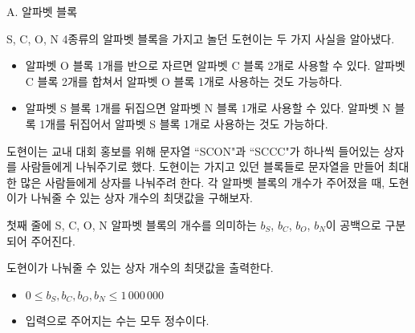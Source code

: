 \def\probtitle{알파벳 블록}
\def\probno{A} %

\begin{problem}{\probno{}. \probtitle{}}

S, C, O, N 4종류의 알파벳 블록을 가지고 놀던 도현이는 두 가지 사실을 알아냈다.

\begin{itemize}[topsep=0pt,noitemsep]
    \item 알파벳 O 블록 1개를 반으로 자르면 알파벳 C 블록 2개로 사용할 수 있다. 알파벳 C 블록 2개를 합쳐서 알파벳 O 블록 1개로 사용하는 것도 가능하다.
    \item 알파벳 S 블록 1개를 뒤집으면 알파벳 N 블록 1개로 사용할 수 있다. 알파벳 N 블록 1개를 뒤집어서 알파벳 S 블록 1개로 사용하는 것도 가능하다.
\end{itemize}

도현이는 교내 대회 홍보를 위해 문자열 ``SCON"과 ``SCCC"가 하나씩 들어있는 상자를 사람들에게 나눠주기로 했다. 도현이는 가지고 있던 블록들로 문자열을 만들어 최대한 많은 사람들에게 상자를 나눠주려 한다. 각 알파벳 블록의 개수가 주어졌을 때, 도현이가 나눠줄 수 있는 상자 개수의 최댓값을 구해보자.

\InputFile

첫째 줄에 S, C, O, N 알파벳 블록의 개수를 의미하는 $b_S$, $b_C$, $b_O$, $b_N$이 공백으로 구분되어 주어진다.

\OutputFile

도현이가 나눠줄 수 있는 상자 개수의 최댓값을 출력한다.

\Constraints

\begin{itemize}[topsep=0pt,noitemsep]
    \item $0 \le b_S, b_C, b_O, b_N \le 1\,000\,000$
    \item 입력으로 주어지는 수는 모두 정수이다.
\end{itemize}

\Example

\begin{example}
\end{example}

\end{problem}